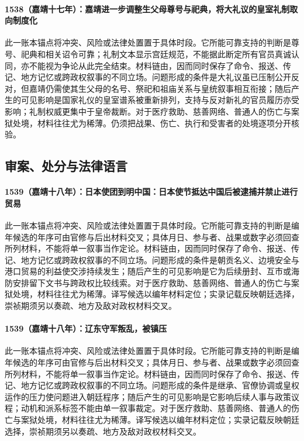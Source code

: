 \paragraph{1538（嘉靖十七年）：嘉靖进一步调整生父母尊号与祀典，将大礼议的皇室礼制取向制度化} 此一账本锚点将冲突、风险或法律处置置于具体时段。它所能可靠支持的判断是尊号、祀典和相关诏令可靠；礼制文本显示宫廷规范，不能据此断定所有官员真诚认同，亦不能视为争论从此完全结束。材料链由，因而同时保存了命令、报送、传记、地方记忆或跨政权叙事的不同立场。问题形成的条件是大礼议虽已压制公开反对，但嘉靖仍需使其生父母的名号、祭祀和祖庙关系与皇统叙事相互衔接；随后产生的可见影响是国家礼仪的皇室谱系被重新排列，支持与反对新礼的官员履历亦受影响；礼制权威更集中于皇帝裁断。对于医疗救助、慈善网络、普通人的伤亡与案狱处境，材料往往尤为稀薄。仍须把战果、伤亡、执行和受害者的处境逐项分开核验。

\subsection{审案、处分与法律语言}

\paragraph{1539（嘉靖十八年）：日本使团到明中国：日本使节抵达中国后被逮捕并禁止进行贸易} 此一账本锚点将冲突、风险或法律处置置于具体时段。它所能可靠支持的判断是编年候选的年序可由官修与后出材料交叉；具体月日、参与者、战果或数字必须回查所列材料，不能将单一叙事当作定论。材料链由，因而同时保存了命令、报送、传记、地方记忆或跨政权叙事的不同立场。问题形成的条件是朝贡名义、边境安全与港口贸易的利益使交涉持续发生；随后产生的可见影响是它为后续册封、互市或海防安排留下文书与跨政权比较线索。对于医疗救助、慈善网络、普通人的伤亡与案狱处境，材料往往尤为稀薄。译写候选以编年材料定位；实录记载反映朝廷选择，崇祯期须另以奏疏、地方及敌对政权材料交叉。

\paragraph{1539（嘉靖十八年）：辽东守军叛乱，被镇压} 此一账本锚点将冲突、风险或法律处置置于具体时段。它所能可靠支持的判断是编年候选的年序可由官修与后出材料交叉；具体月日、参与者、战果或数字必须回查所列材料，不能将单一叙事当作定论。材料链由，因而同时保存了命令、报送、传记、地方记忆或跨政权叙事的不同立场。问题形成的条件是继承、官僚协调或皇权运作的压力使问题进入朝廷程序；随后产生的可见影响是它影响后续人事与政策议程；动机和派系标签不能由单一叙事裁定。对于医疗救助、慈善网络、普通人的伤亡与案狱处境，材料往往尤为稀薄。译写候选以编年材料定位；实录记载反映朝廷选择，崇祯期须另以奏疏、地方及敌对政权材料交叉。


